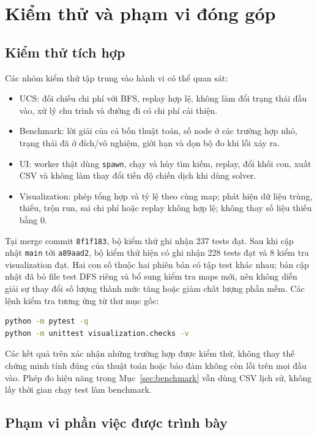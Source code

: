\section{Kiểm thử và phạm vi đóng góp}

\subsection{Kiểm thử tích hợp}

Các nhóm kiểm thử tập trung vào hành vi có thể quan sát:
\begin{itemize}
    \item UCS: đối chiếu chi phí với BFS, replay hợp lệ, không làm đổi
    trạng thái đầu vào, xử lý chu trình và đường đi có chi phí cải thiện.
    \item Benchmark: lời giải của cả bốn thuật toán, số node ở các
    trường hợp nhỏ, trạng thái đã ở đích/vô nghiệm, giới hạn và dọn bộ đo
    khi lỗi xảy ra.
    \item UI: worker thật dùng \texttt{spawn}, chạy và hủy tìm kiếm,
    replay, đổi khối con, xuất CSV và không làm thay đổi tiến độ chiến
    dịch khi dùng solver.
    \item Visualization: phép tổng hợp và tỷ lệ theo cùng map; phát
    hiện dữ liệu trùng, thiếu, trộn run, sai chi phí hoặc replay không
    hợp lệ; không thay số liệu thiếu bằng 0.
\end{itemize}

Tại merge commit \texttt{8f1f183}, bộ kiểm thử ghi nhận 237 tests đạt.
Sau khi cập nhật \texttt{main} tới \texttt{a89aad2}, bộ kiểm thử hiện có
ghi nhận 228 tests đạt và 8 kiểm tra visualization đạt. Hai con số
thuộc hai phiên bản có tập test khác nhau; bản cập nhật đã bỏ file
test DFS riêng và bổ sung kiểm tra maps mới, nên không diễn giải sự
thay đổi số lượng thành mức tăng hoặc giảm chất lượng phần mềm.
Các lệnh kiểm tra tương ứng từ thư mục gốc:

\begin{lstlisting}[language=bash]
python -m pytest -q
python -m unittest visualization.checks -v
\end{lstlisting}

Các kết quả trên xác nhận những trường hợp được kiểm thử, không thay
thế chứng minh tính đúng của thuật toán hoặc bảo đảm không còn lỗi
trên mọi đầu vào. Phép đo hiệu năng trong Mục~\ref{sec:benchmark}
vẫn dùng CSV lịch sử, không lấy thời gian chạy test làm benchmark.

\subsection{Phạm vi phần việc được trình bày}

